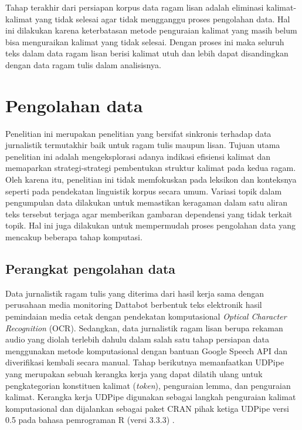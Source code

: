 Tahap terakhir dari persiapan korpus data ragam lisan adalah eliminasi kalimat-kalimat yang tidak selesai agar tidak mengganggu proses pengolahan data. Hal ini dilakukan karena keterbatasan metode penguraian kalimat yang masih belum bisa menguraikan kalimat yang tidak selesai. Dengan proses ini maka seluruh teks dalam data ragam lisan berisi kalimat utuh dan lebih dapat disandingkan dengan data ragam tulis dalam analisisnya.

\section{Pengolahan data}

Penelitian ini merupakan penelitian yang bersifat sinkronis terhadap data jurnalistik termutakhir baik untuk ragam tulis maupun lisan. Tujuan utama penelitian ini adalah mengeksplorasi adanya indikasi efisiensi kalimat dan memaparkan strategi-strategi pembentukan struktur kalimat pada kedua ragam. Oleh karena itu, penelitian ini tidak memfokuskan pada leksikon dan konteksnya seperti pada pendekatan linguistik korpus secara umum. Variasi topik dalam pengumpulan data dilakukan untuk memastikan keragaman dalam satu aliran teks tersebut terjaga agar memberikan gambaran dependensi yang tidak terkait topik. Hal ini juga dilakukan untuk mempermudah proses pengolahan data yang mencakup beberapa tahap komputasi.

\subsection{Perangkat pengolahan data}
Data jurnalistik ragam tulis yang diterima dari hasil kerja sama dengan perusahaan media monitoring Dattabot berbentuk teks elektronik hasil pemindaian media cetak dengan pendekatan komputasional \textit{Optical Character Recognition} (OCR). Sedangkan, data jurnalistik ragam lisan berupa rekaman audio yang diolah terlebih dahulu dalam salah satu tahap persiapan data menggunakan metode komputasional dengan bantuan Google Speech API dan diverifikasi kembali secara manual. Tahap berikutnya memanfaatkan UDPipe \citep{udpipe2017} yang merupakan sebuah kerangka kerja yang dapat dilatih ulang untuk pengkategorian konstituen kalimat (\textit{token}), penguraian lemma, dan penguraian kalimat. Kerangka kerja UDPipe digunakan sebagai langkah penguraian kalimat komputasional dan dijalankan sebagai paket CRAN pihak ketiga UDPipe versi 0.5 \cite{udpipe2017manual} pada bahasa pemrograman R (versi 3.3.3) \citep{r2017project}. 

